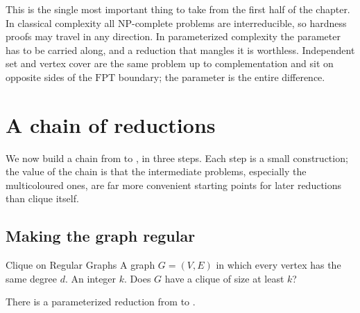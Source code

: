 \begin{intuition}
This is the single most important thing to take from the first half of the
chapter. In classical complexity all \textrm{NP}-complete problems are
interreducible, so hardness proofs may travel in any direction. In
parameterized complexity the parameter has to be carried along, and a reduction
that mangles it is worthless. Independent set and vertex cover are the same
problem up to complementation and sit on opposite sides of the
$\mathrm{FPT}$ boundary; the parameter is the entire difference.
\end{intuition}

\section{A chain of reductions}
\label{sec:reduction-chain}

We now build a chain from  to , in three
steps. Each step is a small construction; the value of the chain is that the
intermediate problems, especially the multicoloured ones, are far more
convenient starting points for later reductions than clique itself.

\subsection{Making the graph regular}

\begin{probdef}{Clique on Regular Graphs}
  \instance A graph $G = (V,E)$ in which every vertex has the same degree $d$.
  \parameter An integer $k$.
  \question Does $G$ have a clique of size at least $k$?
\end{probdef}

\begin{lemma}\label{lem:clique-regular}
There is a parameterized reduction from  to .
\end{lemma}

